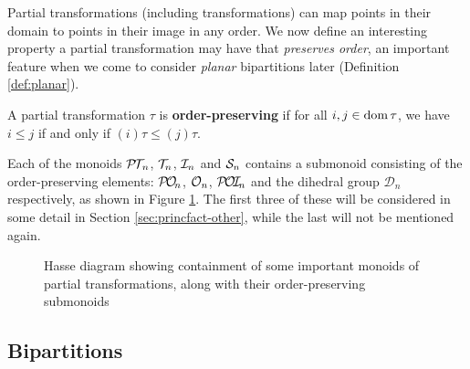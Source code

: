 Partial transformations (including transformations) can map points in their
domain to points in their image in any order.  We now define an interesting
property a partial transformation may have that \textit{preserves order}, an
important feature when we come to consider \textit{planar} bipartitions later
(Definition \ref{def:planar}).

\begin{definition}
  A partial transformation $\tau$ is \textbf{order-preserving} if for all
  $i,j \in \operatorname{dom}\tau$, we have $i \leq j$ if and only if $(i)\tau \leq (j)\tau$.
\end{definition}

Each of the monoids $\mathcal{P\!T\!}_n$, $\mathcal{T}_n$, $\mathcal{I}_n$ and $\mathcal{S}_n$ contains a submonoid
consisting of the order-preserving elements: $\mathcal{P\!O\!}_n$, $\mathcal{O}_n$, $\mathcal{P\!O\!I\!}_n$ and the
dihedral group $\mathcal{D}_n$ respectively, as shown in Figure
\ref{fig:ord-pres}.  The first three of these will be considered in some detail
in Section \ref{sec:princfact-other}, while the last will not be mentioned
again.

\begin{figure}[h]
  \centering
  \caption[Important monoids of partial transformations]{Hasse diagram showing
    containment of some important monoids of partial transformations, along with
    their order-preserving submonoids}
  \label{fig:ord-pres}
\end{figure}

\subsection{Bipartitions}
\label{sec:bipartitions}

